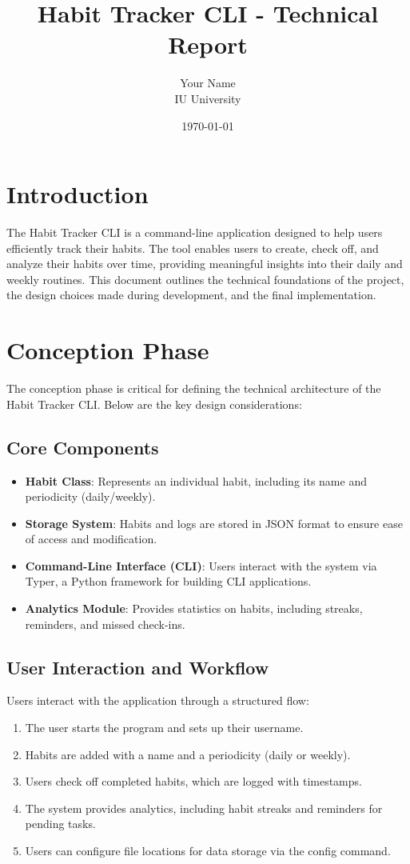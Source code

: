 \documentclass[a4paper,12pt]{article}
\title{Habit Tracker CLI - Technical Report}
\author{Your Name \\ IU University}
\date{\today}
\begin{document}
\maketitle

\section{Introduction}
The Habit Tracker CLI is a command-line application designed to help users efficiently track their habits. The tool enables users to create, check off, and analyze their habits over time, providing meaningful insights into their daily and weekly routines. This document outlines the technical foundations of the project, the design choices made during development, and the final implementation.

\section{Conception Phase}
The conception phase is critical for defining the technical architecture of the Habit Tracker CLI. Below are the key design considerations:

\subsection{Core Components}
\begin{itemize}
    \item \textbf{Habit Class}: Represents an individual habit, including its name and periodicity (daily/weekly).
    \item \textbf{Storage System}: Habits and logs are stored in JSON format to ensure ease of access and modification.
    \item \textbf{Command-Line Interface (CLI)}: Users interact with the system via Typer, a Python framework for building CLI applications.
    \item \textbf{Analytics Module}: Provides statistics on habits, including streaks, reminders, and missed check-ins.
\end{itemize}

\subsection{User Interaction and Workflow}
Users interact with the application through a structured flow:
\begin{enumerate}
    \item The user starts the program and sets up their username.
    \item Habits are added with a name and a periodicity (daily or weekly).
    \item Users check off completed habits, which are logged with timestamps.
    \item The system provides analytics, including habit streaks and reminders for pending tasks.
    \item Users can configure file locations for data storage via the config command.
\end{enumerate}
\end{document}

